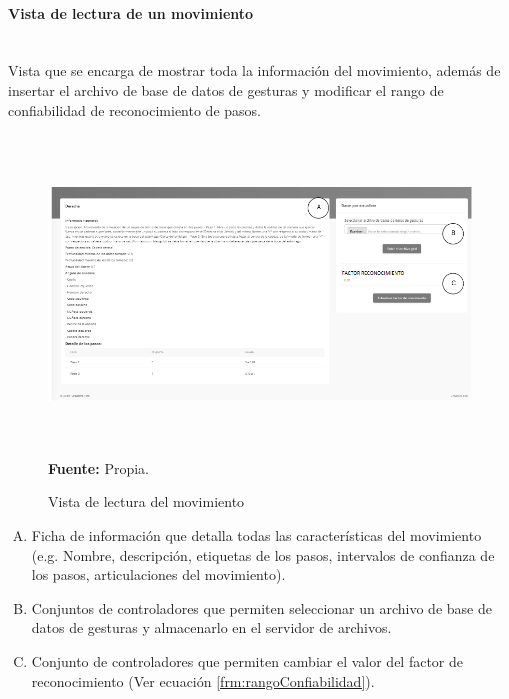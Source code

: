 \paragraph{Vista de lectura de un movimiento}\mbox{} \\ \label{ins:UI:web:read}
Vista que se encarga de mostrar toda la informaci\'on del movimiento, adem\'as de insertar el archivo de base de datos de gesturas y modificar el rango de confiabilidad de reconocimiento de pasos.
\begin{figure}[H]
	\caption{Vista de lectura del movimiento}
	\label{fig:viewRead}
	\centering
	\includegraphics[width=460px,height=320px]{graphics/web-read.PNG} \\
	\textbf{Fuente:} Propia.
\end{figure}
\begin{enumerate}[A.]
\item Ficha de informaci\'on que detalla todas las caracter\'isticas del movimiento (e.g. Nombre, descripci\'on, etiquetas de los pasos, intervalos de confianza de los pasos, articulaciones del movimiento).
\item Conjuntos de controladores que permiten seleccionar un archivo de base de datos de gesturas y almacenarlo en el servidor de archivos.
\item Conjunto de controladores que permiten cambiar el valor del factor de reconocimiento (Ver ecuaci\'on \ref{frm:rangoConfiabilidad}).
\end{enumerate}
